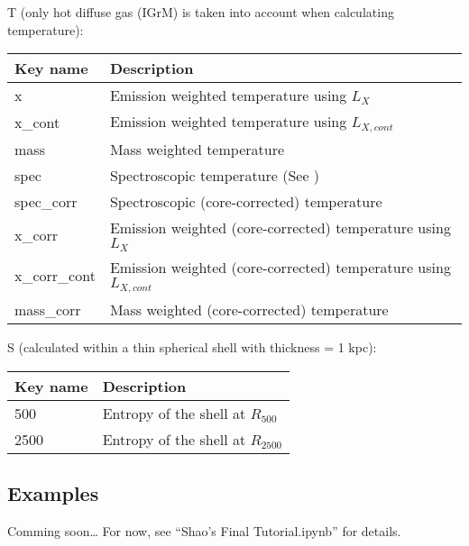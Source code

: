 \documentclass[letterpaper,10pt,english]{sphinxmanual}
\begin{document}
T (only hot diffuse gas (IGrM) is taken into account when calculating temperature):


\begin{savenotes}\sphinxattablestart
\centering
\begin{tabulary}{\linewidth}[t]{|T|T|}
\hline
\sphinxstyletheadfamily 
Key name
&\sphinxstyletheadfamily 
Description
\\
\hline
x
&
Emission weighted temperature using \(L_X\)
\\
\hline
x\_cont
&
Emission weighted temperature using \(L_{X, cont}\)
\\
\hline
mass
&
Mass weighted temperature
\\
\hline
spec
&
Spectroscopic temperature (See )
\\
\hline
spec\_corr
&
Spectroscopic (core-corrected) temperature
\\
\hline
x\_corr
&
Emission weighted (core-corrected) temperature using \(L_X\)
\\
\hline
x\_corr\_cont
&
Emission weighted (core-corrected) temperature using \(L_{X, cont}\)
\\
\hline
mass\_corr
&
Mass weighted (core-corrected) temperature
\\
\hline
\end{tabulary}
\par
\sphinxattableend\end{savenotes}

S (calculated within a thin spherical shell with thickness = 1 kpc):


\begin{savenotes}\sphinxattablestart
\centering
\begin{tabulary}{\linewidth}[t]{|T|T|}
\hline
\sphinxstyletheadfamily 
Key name
&\sphinxstyletheadfamily 
Description
\\
&
Entropy of the shell at \(R_{500}\)
\\
&
Entropy of the shell at \(R_{2500}\)
\\
\hline
\end{tabulary}
\par
\sphinxattableend\end{savenotes}


\subsection{Examples}
\label{\detokenize{Description:examples}}
Comming soon… For now, see “Shao’s Final Tutorial.ipynb” for details.
\end{document}
